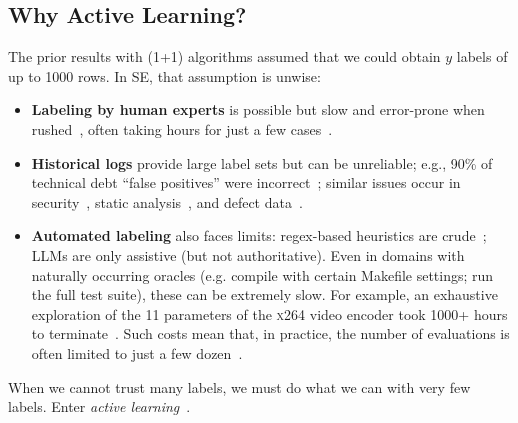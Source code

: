 \documentclass[AMA,STIX2COL]{WileyNJDv5}
\begin{document}
{\subsection{Why Active Learning?}
The prior results with (1+1) algorithms
assumed  that  we could  obtain   $y$ labels of up to 1000 rows.  
In SE, that assumption is unwise:
\begin{itemize}
\item
{\bf Labeling by human experts}  is possible but slow and error-prone when rushed~\cite{easterby1980design}, often taking hours for just a few cases~\cite{KingtonAlison2009,lustosa2024learning,valerdi2010heuristics}.
\item
{\bf Historical logs} provide large label sets but can be unreliable; e.g., 90\% of technical debt “false positives” were incorrect~\cite{yu2020identifying}; similar issues occur in security~\cite{wu2021data}, static analysis~\cite{kang2022detecting}, and defect data~\cite{shepperd2013data}.
\item
{\bf Automated labeling} also faces limits: regex-based heuristics are crude~\cite{kamei2012large}; LLMs are only assistive (but not authoritative).
Even in domains with naturally occurring oracles (e.g. compile with certain Makefile settings; run the full test suite), these can be extremely slow. For example, an exhaustive
exploration of the 11 parameters of the \textsc{x264} video encoder took 1000+  hours to terminate~\cite{DBLP:conf/wosp/ValovPGFC17}. Such costs mean that, in practice, the number of evaluations is often limited to just a few dozen~\cite{DBLP:journals/tse/Nair0MSA20,DBLP:conf/icse/0003XC021}.
\end{itemize}
 When we cannot trust many labels, we must do what we can with very few labels. Enter {\em active learning}~\cite{settles2008analysis}. 
 
}
\end{document}
